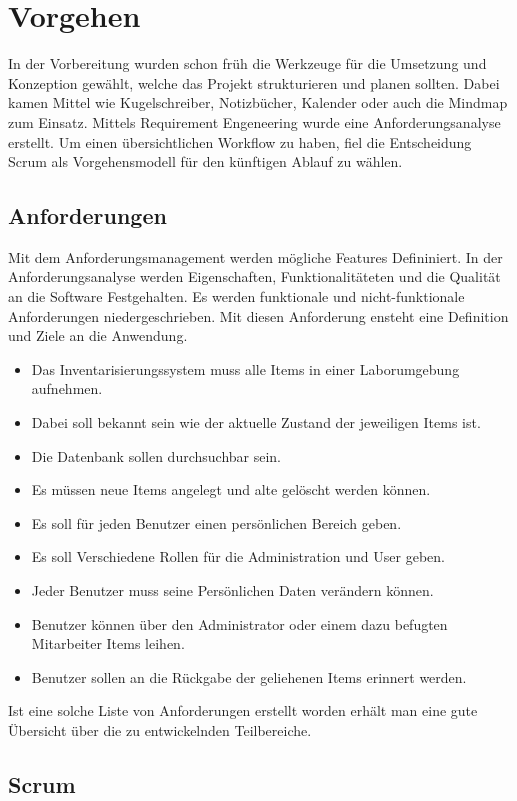 \chapter{Vorgehen}
In der Vorbereitung wurden schon früh die Werkzeuge für die Umsetzung und Konzeption gewählt, welche das Projekt strukturieren und planen sollten. Dabei kamen Mittel wie Kugelschreiber, Notizbücher, Kalender oder auch die Mindmap zum Einsatz. Mittels Requirement Engeneering wurde eine Anforderungsanalyse erstellt. Um einen übersichtlichen Workflow zu haben, fiel die Entscheidung Scrum als Vorgehensmodell für den künftigen Ablauf zu wählen.



\section{Anforderungen}

Mit dem Anforderungsmanagement werden mögliche Features Defininiert. In der Anforderungsanalyse werden Eigenschaften, Funktionalitäteten und die Qualität an die Software Festgehalten. \autocite{100Minuten} Es werden funktionale und nicht-funktionale Anforderungen niedergeschrieben. Mit diesen Anforderung ensteht eine Definition und Ziele an die Anwendung.

\begin{itemize}
\item Das Inventarisierungssystem muss alle Items in einer Laborumgebung aufnehmen. 

\item Dabei soll bekannt sein wie der aktuelle Zustand der jeweiligen Items ist. 

\item Die Datenbank sollen durchsuchbar sein. 

\item Es müssen neue Items angelegt und alte gelöscht werden können. 

\item Es soll für jeden Benutzer einen persönlichen Bereich geben. 

\item Es soll Verschiedene Rollen für die Administration und User geben.

\item Jeder Benutzer muss seine Persönlichen Daten verändern können.

\item Benutzer können über den Administrator oder einem dazu befugten Mitarbeiter Items leihen.

\item Benutzer sollen an die Rückgabe der geliehenen Items erinnert werden.


\end{itemize}

Ist eine solche Liste von Anforderungen erstellt worden erhält man eine gute Übersicht über die zu entwickelnden Teilbereiche.



\section{Scrum}
\label{scrum}



